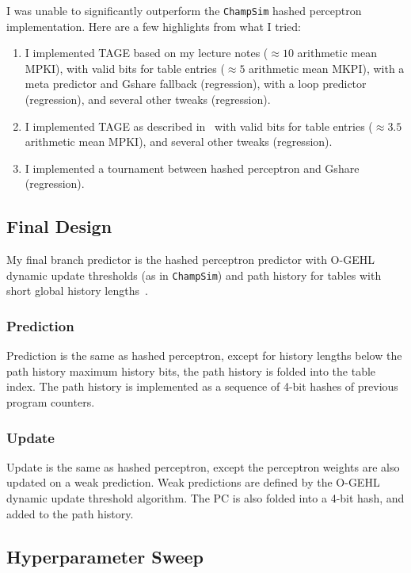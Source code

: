 \documentclass{article}
\begin{document}
I was unable to significantly outperform the \texttt{ChampSim} hashed perceptron implementation. Here are a few highlights from what I tried:
\begin{enumerate}
    \item I implemented TAGE based on my lecture notes ($\approx 10$ arithmetic mean MPKI), with valid bits for table entries ($\approx 5$ arithmetic mean 
    MKPI), with a meta predictor and Gshare fallback (regression), with a loop predictor (regression), and several other tweaks (regression).
    \item  I implemented TAGE as described in~\cite{seznec2006} with valid bits for table entries ($\approx 3.5$ arithmetic mean MPKI), and several other tweaks
    (regression).
    \item I implemented a tournament between hashed perceptron and Gshare (regression).
\end{enumerate} 

\subsection{Final Design}

My final branch predictor is the hashed perceptron predictor with O-GEHL dynamic update thresholds (as in \texttt{ChampSim}) and path history for tables with 
short global history lengths~\cite{seznec2005}. 

\subsubsection{Prediction}

Prediction is the same as hashed perceptron, except for history lengths below the path history maximum history bits, the path history is folded into the table
index. The path history is implemented as a sequence of 4-bit hashes of previous program counters.

\subsubsection{Update}

Update is the same as hashed perceptron, except the perceptron weights are also updated on a weak prediction. Weak predictions are defined by the O-GEHL dynamic
update threshold algorithm. The PC is also folded into a 4-bit hash, and added to the path history.

\subsection{Hyperparameter Sweep}
\end{document}
